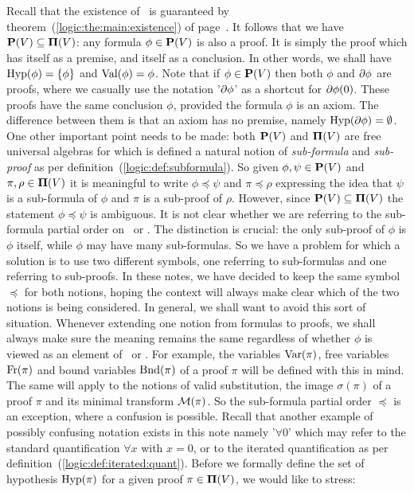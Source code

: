 Recall that the existence of \pvs\ is guaranteed by
theorem~(\ref{logic:the:main:existence}) of
page~\pageref{logic:the:main:existence}. It follows that we have
$\mbox{${\bf P}(V)$}\subseteq\mbox{${\bf\Pi}(V)$}$: any formula $\phi\in\mbox{${\bf P}(V)$}$ is also a proof. It is
simply the proof which has itself as a premise, and itself as a
conclusion. In other words, we shall have $\mbox{\rm Hyp}(\phi)=\{\phi\}$ and
$\mbox{\rm Val}(\phi)=\phi$. Note that if $\phi\in\mbox{${\bf P}(V)$}$ then both $\phi$ and
$\mbox{$\partial$} \phi$ are proofs, where we casually use the notation
'$\mbox{$\partial$}\phi$' as a shortcut for $\mbox{$\partial$}\phi(0)$. These proofs have the
same conclusion $\phi$, provided the formula $\phi$ is an axiom. The
difference between them is that an axiom has no premise, namely
$\mbox{\rm Hyp}(\mbox{$\partial$} \phi)=\emptyset$. One other important point needs to be
made: both $\mbox{${\bf P}(V)$}$ and $\mbox{${\bf\Pi}(V)$}$ are free universal algebras for which is
defined a natural notion of {\em sub-formula} and {\em sub-proof} as
per definition~(\ref{logic:def:subformula}). So given
$\phi,\psi\in\mbox{${\bf P}(V)$}$ and $\pi,\rho\in\mbox{${\bf\Pi}(V)$}$ it is meaningful to write
$\phi\preceq\psi$ and $\pi\preceq\rho$ expressing the idea that
$\psi$ is a sub-formula of $\phi$ and $\pi$ is a sub-proof of
$\rho$. However, since $\mbox{${\bf P}(V)$}\subseteq\mbox{${\bf\Pi}(V)$}$ the statement
$\phi\preceq\psi$ is ambiguous. It is not clear whether we are
referring to the sub-formula partial order on \pv\ or \pvs. The
distinction is crucial: the only sub-proof of $\phi$ is $\phi$
itself, while $\phi$ may have many sub-formulas. So we have a
problem for which a solution is to use two different symbols, one
referring to sub-formulas and one referring to sub-proofs. In these
notes, we have decided to keep the same symbol $\preceq$ for both
notions, hoping the context will always make clear which of the two
notions is being considered. In general, we shall want to avoid this
sort of situation. Whenever extending one notion from formulas to
proofs, we shall always make sure the meaning remains the same
regardless of whether $\phi$ is viewed as an element of \pv\ or
\pvs. For example, the variables $\mbox{\rm Var}(\pi)$, free variables
$\mbox{\rm Fr}(\pi)$ and bound variables $\mbox{\rm Bnd}(\pi)$ of a proof $\pi$ will
be defined with this in mind. The same will apply to the notions of
valid substitution, the image $\sigma(\pi)$ of a proof $\pi$ and its
minimal transform ${\cal M}(\pi)$. So the sub-formula partial order
$\preceq$ is an exception, where a confusion is possible. Recall
that another example of possibly confusing notation exists in this
note namely '$\forall 0$' which may refer to the standard
quantification $\forall x$ with $x=0$, or to the iterated
quantification as per definition~(\ref{logic:def:iterated:quant}).
Before we formally define the set of hypothesis $\mbox{\rm Hyp}(\pi)$ for a
given proof $\pi\in\mbox{${\bf\Pi}(V)$}$, we would like to stress:

